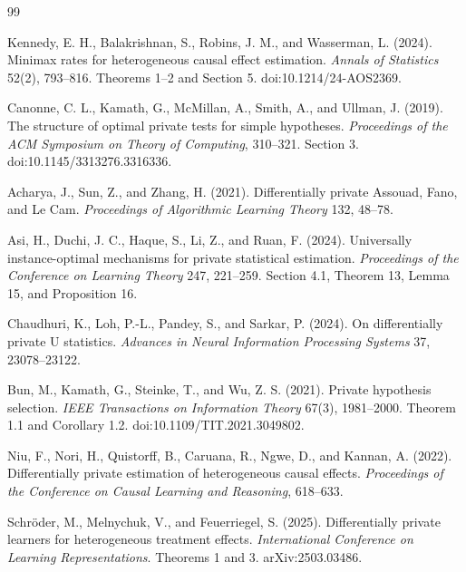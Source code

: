 \documentclass{article}
\begin{document}
\begin{thebibliography}{99}

   Kennedy, E. H., Balakrishnan, S., Robins, J. M., and Wasserman, L. (2024). Minimax rates for heterogeneous causal effect estimation. \emph{Annals of Statistics} 52(2), 793--816. Theorems 1--2 and Section 5. doi:10.1214/24-AOS2369.

   Canonne, C. L., Kamath, G., McMillan, A., Smith, A., and Ullman, J. (2019). The structure of optimal private tests for simple hypotheses. \emph{Proceedings of the ACM Symposium on Theory of Computing}, 310--321. Section 3. doi:10.1145/3313276.3316336.

   Acharya, J., Sun, Z., and Zhang, H. (2021). Differentially private Assouad, Fano, and Le Cam. \emph{Proceedings of Algorithmic Learning Theory} 132, 48--78.

   Asi, H., Duchi, J. C., Haque, S., Li, Z., and Ruan, F. (2024). Universally instance-optimal mechanisms for private statistical estimation. \emph{Proceedings of the Conference on Learning Theory} 247, 221--259. Section 4.1, Theorem 13, Lemma 15, and Proposition 16.

   Chaudhuri, K., Loh, P.-L., Pandey, S., and Sarkar, P. (2024). On differentially private U statistics. \emph{Advances in Neural Information Processing Systems} 37, 23078--23122.

   Bun, M., Kamath, G., Steinke, T., and Wu, Z. S. (2021). Private hypothesis selection. \emph{IEEE Transactions on Information Theory} 67(3), 1981--2000. Theorem 1.1 and Corollary 1.2. doi:10.1109/TIT.2021.3049802.

   Niu, F., Nori, H., Quistorff, B., Caruana, R., Ngwe, D., and Kannan, A. (2022). Differentially private estimation of heterogeneous causal effects. \emph{Proceedings of the Conference on Causal Learning and Reasoning}, 618--633.

   Schröder, M., Melnychuk, V., and Feuerriegel, S. (2025). Differentially private learners for heterogeneous treatment effects. \emph{International Conference on Learning Representations}. Theorems 1 and 3. arXiv:2503.03486.

\end{thebibliography}
\end{document}
